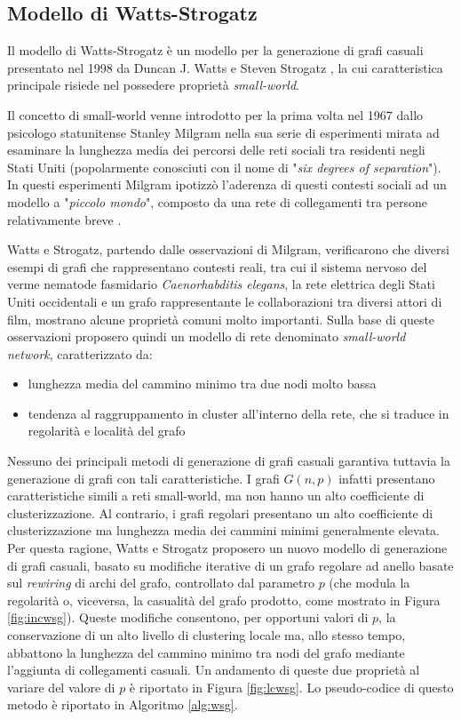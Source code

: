 \subsection{Modello di Watts-Strogatz}
Il modello di Watts-Strogatz è un modello per la generazione di grafi casuali presentato nel 1998 da Duncan J. Watts e Steven Strogatz \cite{watts_collective_1998}, la cui caratteristica principale risiede nel possedere proprietà \textit{small-world}. 

Il concetto di small-world venne introdotto per la prima volta nel 1967 dallo psicologo statunitense Stanley Milgram nella sua serie di esperimenti mirata ad esaminare la lunghezza media dei percorsi delle reti sociali tra residenti negli Stati Uniti (popolarmente conosciuti con il nome di "\textit{six degrees of separation}"). In questi esperimenti Milgram ipotizzò l'aderenza di questi contesti sociali ad un modello a "\textit{piccolo mondo}", composto da una rete di collegamenti tra persone relativamente breve \cite{milgram_small-world_1967}.  

Watts e Strogatz, partendo dalle osservazioni di Milgram, verificarono che diversi esempi di grafi che rappresentano contesti reali, tra cui il sistema nervoso del verme nematode fasmidario \textit{Caenorhabditis elegans}, la rete elettrica degli Stati Uniti occidentali e un grafo rappresentante le collaborazioni tra diversi attori di film, mostrano alcune proprietà comuni molto importanti. Sulla base di queste osservazioni proposero quindi un modello di rete denominato \textit{small-world network}, caratterizzato da:
\begin{itemize}
\item lunghezza media del cammino minimo tra due nodi molto bassa
\item tendenza al raggruppamento in cluster all'interno della rete, che si traduce in regolarità e località del grafo
\end{itemize}

Nessuno dei principali metodi di generazione di grafi casuali garantiva tuttavia la generazione di grafi con tali caratteristiche. I grafi $G(n,p)$ infatti presentano caratteristiche simili a reti small-world, ma non hanno un alto coefficiente di clusterizzazione. Al contrario, i grafi regolari presentano un alto coefficiente di clusterizzazione ma lunghezza media dei cammini minimi generalmente elevata. Per questa ragione, Watts e Strogatz proposero un nuovo modello di generazione di grafi casuali,  basato su modifiche iterative di un grafo regolare ad anello basate sul \textit{rewiring} di archi del grafo, controllato dal parametro $p$ (che modula la regolarità o, viceversa, la casualità del grafo prodotto, come mostrato in Figura \ref{fig:incwsg}). Queste modifiche consentono, per opportuni valori di $p$,  la conservazione di un alto livello di clustering locale ma, allo stesso tempo, abbattono la lunghezza del cammino minimo tra nodi del grafo mediante l'aggiunta di collegamenti casuali.  Un andamento di queste due proprietà al variare del valore di $p$ è riportato in Figura \ref{fig:lcwsg}. Lo pseudo-codice di questo metodo è riportato in Algoritmo \ref{alg:wsg}.

